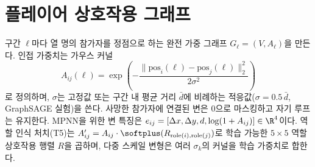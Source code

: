 
\section{플레이어 상호작용 그래프}
\label{sec:feat-graph}

구간 $\ell$마다 열 명의 참가자를 정점으로 하는 완전 가중 그래프 $G_\ell = (V, A_\ell)$을 만든다. 인접 가중치는 가우스 커널
\begin{equation}
  A_{ij}(\ell) = \exp\!\left(-\frac{\|\mathrm{pos}_i(\ell) - \mathrm{pos}_j(\ell)\|_2^2}{2\sigma^2}\right)
  \label{eq:adjacency}
\end{equation}
로 정의하며, $\sigma$는 고정값 또는 구간 내 평균 거리 $\bar d$에 비례하는 적응값($\sigma = 0.5\,\bar d$, GraphSAGE 실험)을 쓴다. 사망한 참가자에 연결된 변은 0으로 마스킹하고 자기 루프는 유지한다. MPNN을 위한 변 특징은 $e_{ij} = [\Delta x, \Delta y, d, \log(1+A_{ij})] \in \R^4$이다. 역할 인식 처치(T5)는 $A'_{ij} = A_{ij}\cdot\softplus(R_{\mathrm{role}(i),\mathrm{role}(j)})$로 학습 가능한 $5\times 5$ 역할 상호작용 행렬 $R$을 곱하며, 다중 스케일 변형은 여러 $\sigma_k$의 커널을 학습 가중치로 합한다.
